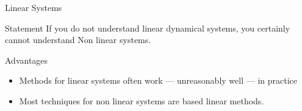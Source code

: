 \documentclass[10pt]{beamer}
\begin{document}
\begin{frame}{Linear Systems}

    \begin{alertblock}{Statement}
        If you do not understand linear dynamical systems, you certainly cannot understand Non linear systems.
    \end{alertblock}
    \begin{block}{Advantages}
    \begin{itemize}
        \item Methods for linear systems often work --- unreasonably well --- in practice
        \item Most techniques for non linear systems are based linear methods.
    \end{itemize}
    \end{block}
    
\end{frame}
\end{document}

